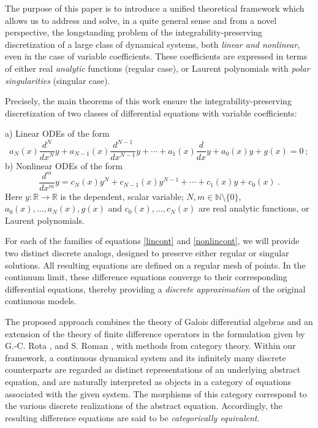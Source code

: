 \documentclass[10pt]{amsart}
\numberwithin{equation}{section}
\theoremstyle{definition}
\begin{document}
The purpose of this paper is to introduce a unified theoretical framework
which allows us to address and solve, in a quite general sense and from
a novel perspective, the longstanding problem of the integrability-preserving
discretization of a large class of dynamical systems, both
\textit{linear and nonlinear}, even in the case of variable coefficients.
These coefficients are expressed in terms of either real
\textit{analytic} functions (regular case), or Laurent polynomials with
\textit{polar singularities} (singular case).

Precisely, the main theorems of this work ensure the integrability-preserving
discretization of two classes of differential equations with variable coefficients:


\noindent
a) Linear ODEs of the form
\begin{equation}
a_{N}(x) \frac{d^{N}}{dx^{N}}y + a_{N-1}(x) \frac{d^{N-1}}{dx^{N-1}}y +
\cdots +a_{1}(x) \frac{d}{dx} y+a_{0}(x) y +g(x)=0 \ ;
\label{lincont}
\end{equation}
b) Nonlinear ODEs of the form
\begin{equation}
\frac{d^{m}}{dx^{m}}y= c_{N}(x) y^{N}+c_{N-1}(x) y^{N-1}+\cdots +c_{1}(x)
y+ c_{0}(x) \ .
\label{nonlincont}
\end{equation}
Here $y: \mathbb{R}\to \mathbb{R}$ is the dependent, scalar variable;
$N, m\in \mathbb{N}\setminus \{0\}$,
$a_{0}(x),\ldots , a_{N}(x), g(x)$ and $c_{0}(x),\ldots , c_{N}(x)$ are
real analytic functions, or Laurent polynomials.

For each of the families of equations \eqref{lincont} and \eqref{nonlincont}, we will provide two distinct discrete analogs, designed
to preserve either regular or singular solutions. All resulting equations
are defined on a regular mesh of points. In the continuum limit, these
difference equations converge to their corresponding differential equations,
thereby providing a \textit{discrete approximation} of the original continuous
models.

The proposed approach combines the theory of Galois differential algebras
and an extension of the theory of finite difference operators in the formulation
given by G.-C. Rota \cite{Rota}, and S. Roman \cite{Roman}, with methods
from category theory. Within our framework, a continuous dynamical system
and its infinitely many discrete counterparts are regarded as distinct
representations of an underlying abstract equation, and are naturally interpreted
as objects in a category of equations associated with the given system.
The morphisms of this category correspond to the various discrete realizations
of the abstract equation. Accordingly, the resulting difference equations
are said to be \textit{categorically equivalent}.
\end{document}
